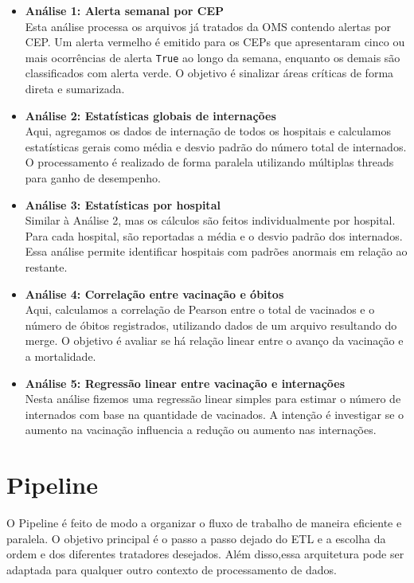 \documentclass[a4paper,12pt]{article}
\begin{document}
\begin{itemize}
    \item \textbf{Análise 1: Alerta semanal por CEP} \\
    Esta análise processa os arquivos já tratados da OMS contendo alertas por CEP. Um alerta vermelho é emitido para os CEPs que apresentaram cinco ou mais ocorrências de alerta \texttt{True} ao longo da semana, enquanto os demais são classificados com alerta verde. O objetivo é sinalizar áreas críticas de forma direta e sumarizada.

    \item \textbf{Análise 2: Estatísticas globais de internações} \\
    Aqui, agregamos os dados de internação de todos os hospitais e calculamos estatísticas gerais como média e desvio padrão do número total de internados. O processamento é realizado de forma paralela utilizando múltiplas threads para ganho de desempenho.

    \item \textbf{Análise 3: Estatísticas por hospital} \\
    Similar à Análise 2, mas os cálculos são feitos individualmente por hospital. Para cada hospital, são reportadas a média e o desvio padrão dos internados. Essa análise permite identificar hospitais com padrões anormais em relação ao restante.

    \item \textbf{Análise 4: Correlação entre vacinação e óbitos} \\
    Aqui, calculamos a correlação de Pearson entre o total de vacinados e o número de óbitos registrados, utilizando dados de um arquivo resultando do merge. O objetivo é avaliar se há relação linear entre o avanço da vacinação e a mortalidade.
    
    \item \textbf{Análise 5: Regressão linear entre vacinação e internações} \\
    Nesta análise fizemos uma regressão linear simples para estimar o número de internados com base na quantidade de vacinados. A intenção é investigar se o aumento na vacinação influencia a redução ou aumento nas internações.
\end{itemize}

\section{Pipeline}
O Pipeline é feito de modo a organizar o fluxo de trabalho de maneira eficiente e paralela. O objetivo principal é o passo a passo dejado do ETL e a escolha da ordem e dos diferentes tratadores desejados. Além disso,essa arquitetura pode ser adaptada para qualquer outro contexto de processamento de dados.
\end{document}
